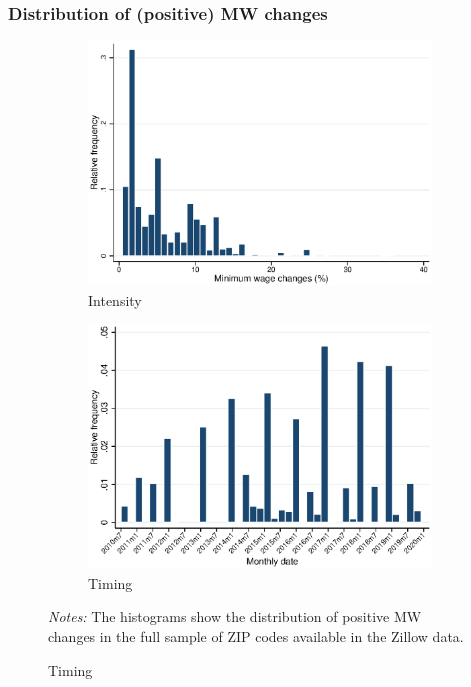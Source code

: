 \begin{frame}[label=dist_mw_changes]
	\frametitle{Distribution of (positive) MW changes}
	
	\begin{figure}[h!]	\centering
		\begin{subfigure}{.49\textwidth}
			\caption{Intensity}
			\includegraphics[width = .91\textwidth]
			{../../analysis/descriptive/output/pct_ch_mw_dist.eps}
		\end{subfigure}%
		\begin{subfigure}{.49\textwidth}
			\caption{Timing}
			\includegraphics[width = .91\textwidth]
			{../../analysis/descriptive/output/pct_ch_mw_date_dist.eps}
		\end{subfigure}
		\begin{minipage}{.95\textwidth} \scriptsize \vspace{1mm}
			\textit{Notes:} The histograms show the distribution of positive MW changes 
			in the full sample of ZIP codes available in the Zillow data.
		\end{minipage}
	\end{figure}
	
	\hyperlink{stat_MW}{}
\end{frame}

